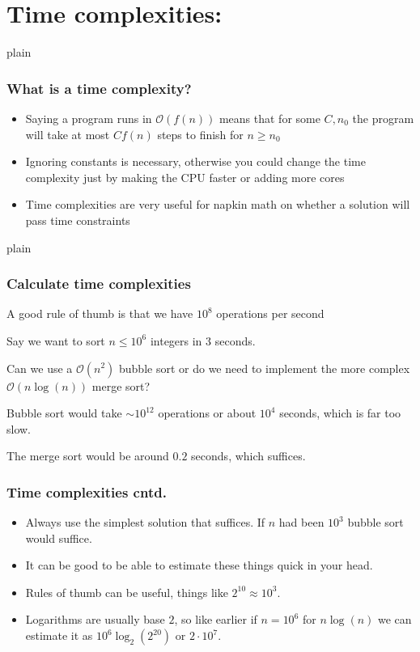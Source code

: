 \documentclass{beamer}
\begin{document}
\section*{Time complexities:}

\begin{frame}{plain}
    \frametitle{What is a time complexity?}
    \begin{itemize}
        \item Saying a program runs in $\mathcal{O}(f(n))$ means that for some $C, n_0$ the program will take at most $C f(n)$ steps to finish for $n \geq n_0$
        \item Ignoring constants is necessary, otherwise you could change the time complexity just by making the CPU faster or adding more cores
        \item Time complexities are very useful for napkin math on whether a solution will pass time constraints
    \end{itemize}
\end{frame}

\begin{frame}{plain}
    \frametitle{Calculate time complexities}
    \begin{itemize}
        \item A good rule of thumb is that we have $10^8$ operations per second
         {
            \item Say we want to sort $n \leq 10^6$ integers in 3 seconds.
            \item Can we use a $\mathcal{O}(n^2)$ bubble sort or do we need to implement the more complex $\mathcal{O}(n\log(n))$ merge sort?
             {
                \item Bubble sort would take $\sim 10^{12}$ operations or about $10^4$ seconds, which is far too slow.
                \item The merge sort would be around $0.2$ seconds, which suffices.
            }
        }
    \end{itemize}
\end{frame}

\begin{frame}[plain]
    \frametitle{Time complexities cntd.}
    \begin{itemize}
        \item Always use the simplest solution that suffices. If $n$ had been $10^3$ bubble sort would suffice.
        \item It can be good to be able to estimate these things quick in your head.
        \item Rules of thumb can be useful, things like $2^{10} \approx 10^3$.
        \item Logarithms are usually base $2$, so like earlier if $n = 10^6$ for $n\log(n)$ we can estimate it as $10^6 \log_2(2^{20})$ or $2 \cdot 10^7$.
    \end{itemize}
\end{frame}
\end{document}
